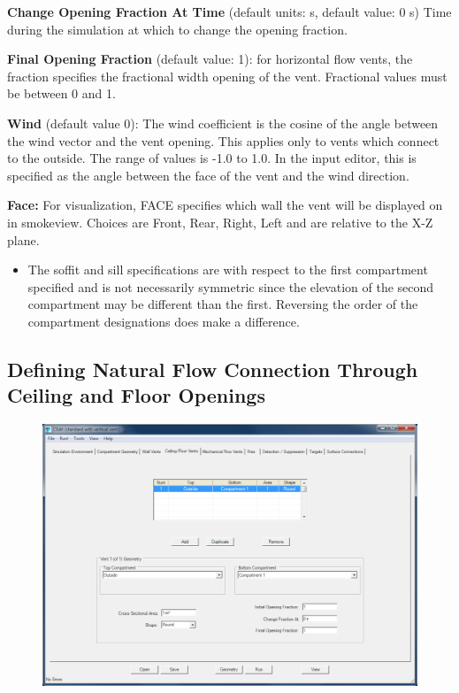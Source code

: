 \textbf{Change Opening Fraction At Time}  (default units: s, default value: 0 s)  Time during the simulation at which to change the opening fraction.

\textbf{Final Opening Fraction} (default value: 1): for horizontal flow vents, the fraction specifies the fractional width opening of the vent. Fractional values must be between 0 and 1.

\textbf{Wind} (default value 0): The wind coefficient is the cosine of the angle between the wind vector and the vent opening.  This applies only to vents which connect to the outside.  The range of values is -1.0 to 1.0.  In the input editor, this is specified as the angle between the face of the vent and the wind direction.

\textbf{Face:} For visualization, FACE specifies which wall the vent will be displayed on in smokeview.  Choices are Front, Rear, Right, Left and are relative to the X-Z plane.

\begin{itemize}
\item The soffit and sill specifications are with respect to the first compartment specified and is not necessarily symmetric since the elevation of the second compartment may be different than the first.  Reversing the order of the compartment designations does make a difference.
\end{itemize}

\subsection{Defining Natural Flow Connection Through Ceiling and Floor Openings}

\begin{figure}[h!]
\includegraphics[width=6.5in]{FIGURES/Input_File/Vertical_Flow_Tab}
\end{figure}

